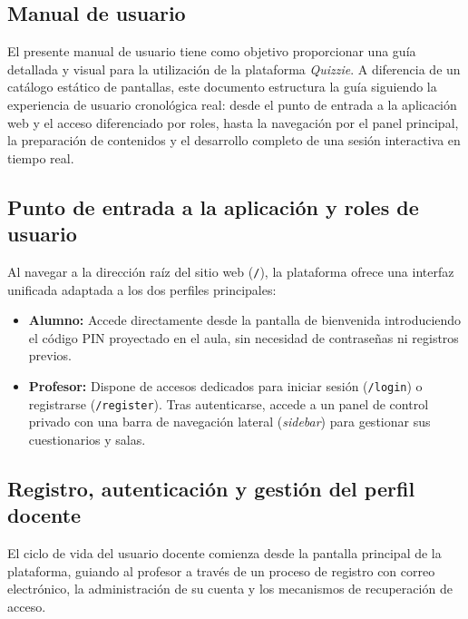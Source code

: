 \begin{appendices}
\chapter{Manual de usuario}\label{anexo:manual_de_usuario}

El presente manual de usuario tiene como objetivo proporcionar una guía detallada y visual para la utilización de la plataforma \textit{Quizzie}. A diferencia de un catálogo estático de pantallas, este documento estructura la guía siguiendo la experiencia de usuario cronológica real: desde el punto de entrada a la aplicación web y el acceso diferenciado por roles, hasta la navegación por el panel principal, la preparación de contenidos y el desarrollo completo de una sesión interactiva en tiempo real.

\section*{Punto de entrada a la aplicación y roles de usuario}

Al navegar a la dirección raíz del sitio web (\texttt{/}), la plataforma ofrece una interfaz unificada adaptada a los dos perfiles principales:

\begin{itemize}
    \item[\tiny$\blacksquare$] \textbf{Alumno:} Accede directamente desde la pantalla de bienvenida introduciendo el código PIN proyectado en el aula, sin necesidad de contraseñas ni registros previos.
    \item[\tiny$\blacksquare$] \textbf{Profesor:} Dispone de accesos dedicados para iniciar sesión (\texttt{/login}) o registrarse (\texttt{/register}). Tras autenticarse, accede a un panel de control privado con una barra de navegación lateral (\textit{sidebar}) para gestionar sus cuestionarios y salas.
\end{itemize}

\section*{Registro, autenticación y gestión del perfil docente}

El ciclo de vida del usuario docente comienza desde la pantalla principal de la plataforma, guiando al profesor a través de un proceso de registro con correo electrónico, la administración de su cuenta y los mecanismos de recuperación de acceso.


\end{appendices}
